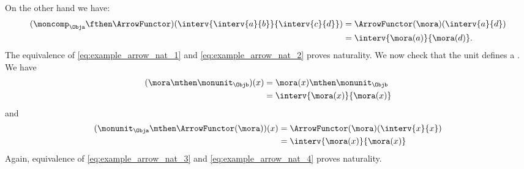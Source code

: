 %
On the other hand we have:
%
\begin{equation}
    \label{eq:example_arrow_nat_2}
    \begin{aligned}
        (\moncomp_\Obja \fthen \ArrowFunctor)(\interv{\interv{a}{b}}{\interv{c}{d}})
         & =\ArrowFunctor(\mora)(\interv{a}{d}) \\
         & =\interv{\mora(a)}{\mora(d)}.
    \end{aligned}
\end{equation}
%
The equivalence of \cref{eq:example_arrow_nat_1} and \cref{eq:example_arrow_nat_2} proves naturality.
We now check that the unit defines a .
We have
%
\begin{equation}
    \label{eq:example_arrow_nat_3}
    \begin{aligned}
        (\mora \mthen \monunit_\Objb)(x)
         & =\mora(x)\mthen \monunit_\Objb \\
         & =\interv{\mora(x)}{\mora(x)}
    \end{aligned}
\end{equation}
%
and
%
\begin{equation}
    \label{eq:example_arrow_nat_4}
    \begin{aligned}
        (\monunit_\Obja \mthen \ArrowFunctor(\mora))(x)
         & =\ArrowFunctor(\mora)(\interv{x}{x}) \\
         & =\interv{\mora(x)}{\mora(x)}
    \end{aligned}
\end{equation}
%
Again, equivalence of \cref{eq:example_arrow_nat_3} and \cref{eq:example_arrow_nat_4} proves naturality.

